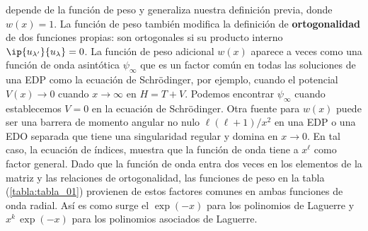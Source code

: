 depende de la función de peso y generaliza nuestra definición previa, donde $w(x) = 1$. La función de peso también modifica la definición de \textbf{ortogonalidad} de dos funciones propias: son ortogonales si su producto interno $\ip{u_{\lambda^{\prime}}}{u_{\lambda}} = 0$. La función de peso adicional $w(x)$ aparece a veces como una función de onda asintótica $\psi_{\infty}$ que es un factor común en todas las soluciones de una EDP como la ecuación de Schrödinger, por ejemplo, cuando el potencial $V(x) \to 0$ cuando $x \to \infty$ en $H = T + V$. Podemos encontrar $\psi_{\infty}$ cuando establecemos $V = 0$ en la ecuación de Schrödinger. Otra fuente para $w(x)$ puede ser una barrera de momento angular no nulo $\ell (\ell +1)/x^{2}$ en una EDP o una EDO separada que tiene una singularidad regular y domina en $x \to 0$. En tal caso, la ecuación de índices, muestra que la función de onda tiene a $x^{\ell}$ como factor general. Dado que la función de onda entra dos veces en los elementos de la matriz y las relaciones de ortogonalidad, las funciones de peso en la tabla (\ref{tabla:tabla_01}) provienen de estos factores comunes en ambas funciones de onda radial. Así es como surge el $\exp(-x)$ para los polinomios de Laguerre y $x^{k} \, \exp(-x)$ para los polinomios asociados de Laguerre.
